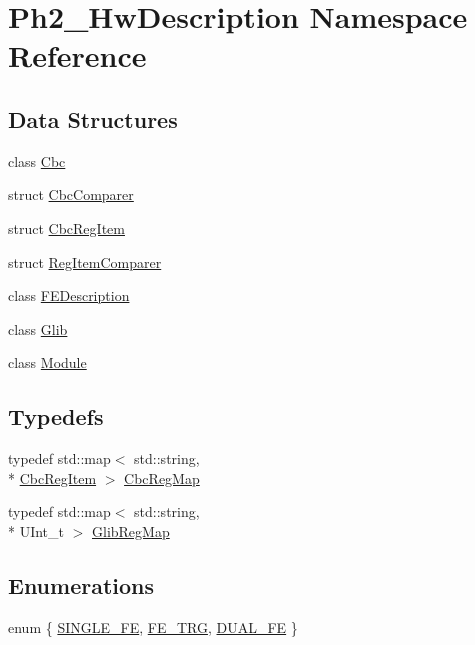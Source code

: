 \hypertarget{namespace_ph2___hw_description}{\section{Ph2\-\_\-\-Hw\-Description Namespace Reference}
\label{namespace_ph2___hw_description}
}
\subsection*{Data Structures}
\begin{DoxyCompactItemize}
\item 
class \hyperlink{class_ph2___hw_description_1_1_cbc}{Cbc}
\item 
struct \hyperlink{struct_ph2___hw_description_1_1_cbc_comparer}{Cbc\-Comparer}
\item 
struct \hyperlink{struct_ph2___hw_description_1_1_cbc_reg_item}{Cbc\-Reg\-Item}
\item 
struct \hyperlink{struct_ph2___hw_description_1_1_reg_item_comparer}{Reg\-Item\-Comparer}
\item 
class \hyperlink{class_ph2___hw_description_1_1_f_e_description}{F\-E\-Description}
\item 
class \hyperlink{class_ph2___hw_description_1_1_glib}{Glib}
\item 
class \hyperlink{class_ph2___hw_description_1_1_module}{Module}
\end{DoxyCompactItemize}
\subsection*{Typedefs}
\begin{DoxyCompactItemize}
\item 
typedef std\-::map$<$ std\-::string, \\*
\hyperlink{struct_ph2___hw_description_1_1_cbc_reg_item}{Cbc\-Reg\-Item} $>$ \hyperlink{namespace_ph2___hw_description_a9a23b373068f169aa67ca1d22c9a6001}{Cbc\-Reg\-Map}
\item 
typedef std\-::map$<$ std\-::string, \\*
U\-Int\-\_\-t $>$ \hyperlink{namespace_ph2___hw_description_a1fd478712d074fa51fc2185802bbfd90}{Glib\-Reg\-Map}
\end{DoxyCompactItemize}
\subsection*{Enumerations}
\begin{DoxyCompactItemize}
\item 
enum \{ \hyperlink{namespace_ph2___hw_description_ae27a2135d85c2171ebd17024e2ce2c64aa30d72f6d58dc25b003fbf8bf56b3ace}{S\-I\-N\-G\-L\-E\-\_\-\-F\-E}, 
\hyperlink{namespace_ph2___hw_description_ae27a2135d85c2171ebd17024e2ce2c64a6e0b877d015d017f61b07618e057c452}{F\-E\-\_\-\-T\-R\-G}, 
\hyperlink{namespace_ph2___hw_description_ae27a2135d85c2171ebd17024e2ce2c64ae3b57cb16641bb367bfc57a00315a4ca}{D\-U\-A\-L\-\_\-\-F\-E}
 \}
\end{DoxyCompactItemize}


